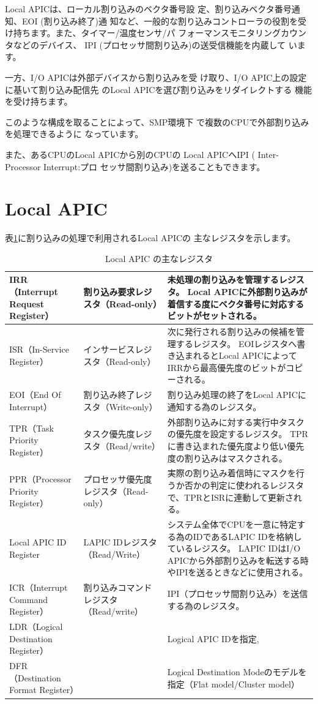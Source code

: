  Local APICは、ローカル割り込みのベクタ番号設
定、割り込みベクタ番号通知、EOI (割り込み終了)通
知など、一般的な割り込みコントローラの役割を受
け持ちます。また、タイマー/温度センサ/パ
フォーマンスモニタリングカウンタなどのデバイス、
IPI (プロセッサ間割り込み)の送受信機能を内蔵して
います。

 一方、I/O APICは外部デバイスから割り込みを受
け取り、I/O APIC上の設定に基いて割り込み配信先
のLocal APICを選び割り込みをリダイレクトする
機能を受け持ちます。

 このような構成を取ることによって、SMP環境下
で複数のCPUで外部割り込みを処理できるように
なっています。

 また、あるCPUのLocal APICから別のCPUの
Local APICへIPI ( Inter-Processor Interrupt:プロ
セッサ間割り込み)を送ることもできます。


\section{Local APIC}

 表\ref{table1}に割り込みの処理で利用されるLocal APICの
主なレジスタを示します。

\begin{table}\centering
\begin{tabular}{|p{3cm}|p{3cm}|p{10cm}|} \hline
IRR（Interrupt Request Register） & 割り込み要求レジスタ（Read-only）&
未処理の割り込みを管理するレジスタ。
Local APICに外部割り込みが着信する度にベクタ番号に対応するビットがセットされる。 \\
\hline
ISR（In-Service Register）& インサービスレジスタ（Read-only） &
次に発行される割り込みの候補を管理するレジスタ。
EOIレジスタへ書き込まれるとLocal APICによってIRRから最高優先度のビットがコピーされる。 \\
\hline
EOI（End Of Interrupt）& 割り込み終了レジスタ（Write-only） &
割り込み処理の終了をLocal APICに通知する為のレジスタ。 \\
\hline
TPR（Task Priority Register）&  タスク優先度レジスタ（Read/write） &
外部割り込みに対する実行中タスクの優先度を設定するレジスタ。
TPRに書き込まれた優先度より低い優先度の割り込みはマスクされる。 \\
\hline
PPR（Processor Priority Register）&  プロセッサ優先度レジスタ（Read-only） &
実際の割り込み着信時にマスクを行うか否かの判定に使われるレジスタで、TPRとISRに連動して更新される。 \\
\hline
Local APIC ID Register & LAPIC IDレジスタ（Read/Write） &
システム全体でCPUを一意に特定する為のIDであるLAPIC IDを格納しているレジスタ。
LAPIC IDはI/O APICから外部割り込みを転送する時やIPIを送るときなどに使用される。 \\
\hline
ICR（Interrupt Command Register）& 割り込みコマンドレジスタ（Read/write）& 
IPI（プロセッサ間割り込み）を送信する為のレジスタ。\\
\hline
LDR（Logical Destination Register）&& Logical APIC IDを指定, \\
\hline
DFR（Destination Format Register）&& Logical Destination Modeのモデルを指定（Flat model/Cluster model）\\
\hline
\end{tabular}
\caption{Local APIC の主なレジスタ}
\label{table1}
\end{table}

